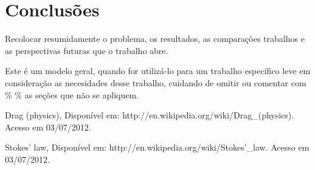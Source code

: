 \section{Conclusões}
Recolocar resumidamente o problema, os resultados, as comparações
trabalhos e as perspectivas futuras que o trabalho abre.

{\color{red} Este é um modelo geral, quando for utilizá-lo para um trabalho
específico leve em consideração as necesidades desse trabalho,
cuidando de omitir ou comentar com \% \% as seções que não
se apliquem.}

\begin{thebibliography}{99}

Drag (physics), 
Disponível em: http://en.wikipedia.org/wiki/Drag\_(physics).
Acesso em 03/07/2012.

Stokes' law, 
Disponível em: http://en.wikipedia.org/wiki/Stokes'\_law.
Acesso em 03/07/2012.

\end{thebibliography}



